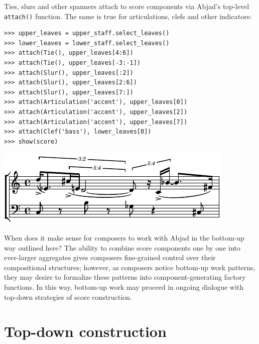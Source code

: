 \documentclass{article}
\begin{document}
\noindent Ties, slurs and other spanners attach to score components via Abjad's
top-level \texttt{attach()} function. The same is true for articulations, clefs and other indicators:

\begin{lstlisting}
>>> upper_leaves = upper_staff.select_leaves()
>>> lower_leaves = lower_staff.select_leaves()
>>> attach(Tie(), upper_leaves[4:6])
>>> attach(Tie(), upper_leaves[-3:-1])
>>> attach(Slur(), upper_leaves[:2])
>>> attach(Slur(), upper_leaves[2:6])
>>> attach(Slur(), upper_leaves[7:])
>>> attach(Articulation('accent'), upper_leaves[0])
>>> attach(Articulation('accent'), upper_leaves[2])
>>> attach(Articulation('accent'), upper_leaves[7])
>>> attach(Clef('bass'), lower_leaves[0])
>>> show(score)
\end{lstlisting}
\includegraphics{assets/lilypond-19c9fd0f2ed858d81b6840584a4e0cc8.pdf}

\noindent When does it make sense for composers to work with Abjad in the bottom-up way outlined here? The ability to combine score components one by one into ever-larger
aggregates gives composers fine-grained control over their compositional
structures; however, as composers notice bottom-up work patterns, they may desire to formalize these patterns into component-generating factory functions. In this way, bottom-up work may proceed in ongoing dialogue with top-down strategies of score construction.

\section{Top-down construction} \label{sec:top-down}
\end{document}
